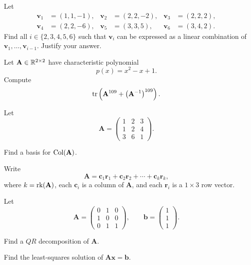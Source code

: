 \begin{problem}
Let
\[
\begin{aligned}
\mathbf v_1&=(1,1,-1),&
\mathbf v_2&=(2,2,-2),&
\mathbf v_3&=(2,2,2),\\
\mathbf v_4&=(2,2,-6),&
\mathbf v_5&=(3,3,5),&
\mathbf v_6&=(3,4,2).
\end{aligned}
\]
Find all $i\in\{2,3,4,5,6\}$ such that $\mathbf v_i$ can be expressed as a linear combination of $\mathbf v_1,\dots,\mathbf v_{i-1}$. Justify your answer.
\end{problem}

\begin{problem}
Let $\mathbf A\in\mathbb{R}^{2\times2}$ have characteristic polynomial
\[
p(x)=x^2-x+1.
\]
Compute
\[
\operatorname{tr}\left(\mathbf A^{109}+\bigl(\mathbf A^{-1}\bigr)^{109}\right).
\]
\end{problem}

\begin{problem}
Let
\[
\mathbf A=
\begin{pmatrix}
1&2&3\\
1&2&4\\
3&6&1
\end{pmatrix}.
\]
\begin{problemsubparts}
\item Find a basis for $\operatorname{Col}(\mathbf A)$.
\item Write
\[
\mathbf A=\mathbf c_1\mathbf r_1+\mathbf c_2\mathbf r_2+\cdots+\mathbf c_k\mathbf r_k,
\]
where $k=\operatorname{rk}(\mathbf A)$, each $\mathbf c_i$ is a column of $\mathbf A$, and each $\mathbf r_i$ is a $1\times3$ row vector.
\end{problemsubparts}
\end{problem}

\begin{problem}
Let
\[
\mathbf A=
\begin{pmatrix}
0&1&0\\
1&0&0\\
0&1&1
\end{pmatrix},
\qquad
\mathbf b=
\begin{pmatrix}1\\1\\1\end{pmatrix}.
\]
\begin{problemsubparts}
\item Find a $QR$ decomposition of $\mathbf A$.
\item Find the least-squares solution of $\mathbf A\mathbf x=\mathbf b$.
\end{problemsubparts}
\end{problem}

